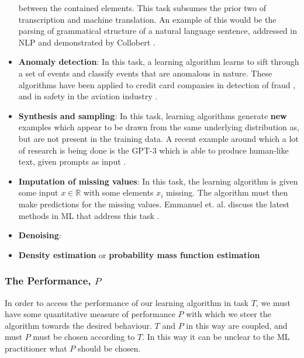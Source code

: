 \begin{itemize}
    between the contained elements. This task subsumes the prior two of
    transcription and machine translation. An example of this would be the
    parsing of grammatical structure of a natural language sentence,
    addressed in \gls{NLP} and demonstrated by Collobert
    \cite{pmlr-v15-collobert11a}.
    \item \textbf{Anomaly detection}: In this task, a learning algorithm learns
    to sift through a set of events and classify events that are anomalous
    in nature. These algorithms have been applied to credit card companies
    in detection of fraud \cite{DBLP:journals/corr/abs-2108-10005}, and in
    safety in the aviation industry \cite{Janakiraman2016, Basora2019}.
    \item \textbf{Synthesis and sampling}: In this task, learning algorithms
    generate \textbf{new} examples which appear to be drawn from the same
    underlying distribution as, but are not present in the training data.
    A recent example around which a lot of research is being done is the
    \gls{GPT-3} which is able to produce human-like text, given prompts as
    input \cite{DBLP:journals/corr/abs-2005-14165}.
    \item \textbf{Imputation of missing values}: In this task, the learning
    algorithm is given some input $x\in\mathbb{R}$ with some elements
    $x_i$ missing. The algorithm must then make predictions for the
    missing values. Emmanuel et. al. discuss the latest methods in
    \gls{ML} that address this task \cite{Emmanuel2021}.
    \item \textbf{Denoising}:
    \item \textbf{Density estimation} or \textbf{probability mass function estimation}
\end{itemize}


\subsubsection{The Performance, $P$\label{sec:ML-performance}}
In order to access the performance of our learning algorithm in task $T$,
we must have some quantitative measure of performance $P$ with which we steer
the algorithm towards the desired behaviour. $T$ and $P$ in this way are
coupled, and must $P$ must be chosen according to $T$. In this way it can be
unclear to the \gls{ML} practitioner what $P$ should be chosen.

